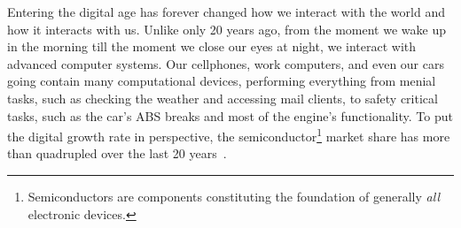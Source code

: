 %
%
%
%
%

Entering the digital age has forever changed how we interact with the world and how it interacts with us.
Unlike only 20 years ago, from the moment we wake up in the morning till the moment we close our eyes at night, we interact with advanced computer systems.
Our cellphones, work computers, and even our cars going contain many computational devices, performing everything from menial tasks, such as checking the weather and accessing mail clients, to safety critical tasks, such as the car's ABS breaks and most of the engine's functionality.
To put the digital growth rate in perspective, the semiconductor\footnote{Semiconductors are components constituting the foundation of generally \emph{all} electronic devices.} market share has more than quadrupled over the last 20 years~\cite{statista:2022}.

